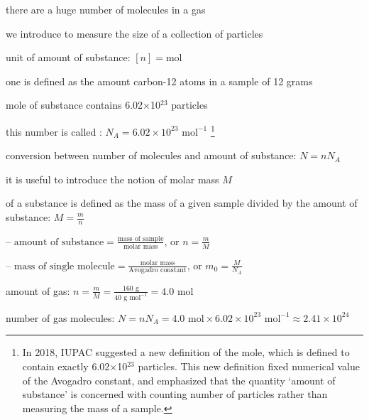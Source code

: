 there are a huge number of molecules in a gas

we introduce  to measure the size of a collection of particles

\cmt unit of amount of substance: $[n] = \text{mol}$

\begin{ilight}
	one  is defined as the amount carbon-12 atoms in a sample of 12 grams
\end{ilight}

 mole of substance contains 6.02$\times$10$^{23}$ particles

this number is called : $N_A = 6.02\times10^{23} \text{ mol}^{-1}$ \footnote{In 2018, IUPAC suggested a new definition of the mole, which is defined to contain exactly 6.02$\times$10$^{23}$ particles. This new definition fixed numerical value of the Avogadro constant, and emphasized that the quantity `amount of substance' is concerned with counting number of particles rather than measuring the mass of a sample.}

conversion between number of molecules and amount of substance: $\boxed{N=nN_A}$

\cmt it is useful to introduce the notion of molar mass $M$

\begin{ilight}
	 of a substance is defined as the mass of a given sample divided by the amount of substance: $M=\frac{m}{n}$
\end{ilight}

\begin{compactitem}
	\item[--] $\text{amount of substance} = \frac{\text{mass of sample}}{\text{molar mass}}$, or $n = \frac{m}{M}$
	
	\eqyskip
	
	\item[--] $\text{mass of single molecule} = \frac{\text{molar mass}}{\text{Avogadro constant}}$, or $m_0 = \frac{M}{N_A}$
\end{compactitem}


\sol amount of gas: $n=\frac{m}{M} = \frac{160 \text{ g}}{40 \text{ g mol}^{-1}} = 4.0 \text{ mol}$

number of gas molecules: $N = n N_A = 4.0 \text{ mol} \times 6.02\times10^{23} \text{ mol}^{-1} \approx 2.41 \times 10^{24}$ \eoe

